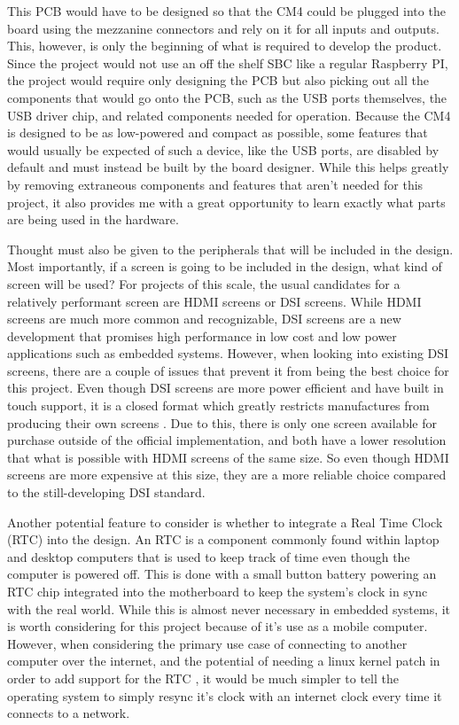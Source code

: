This PCB would have to be designed so that the CM4 could be plugged into the board using the mezzanine connectors and rely on it for all inputs and outputs.
This, however, is only the beginning of what is required to develop the product.
Since the project would not use an off the shelf SBC like a regular Raspberry PI, the project would require only designing the PCB but also picking out all the components that would go onto the PCB, such as the USB ports themselves, the USB driver chip, and related components needed for operation.
Because the CM4 is designed to be as low-powered and compact as possible, some features that would usually be expected of such a device, like the USB ports, are disabled by default and must instead be built by the board designer.
While this helps greatly by removing extraneous components and features that aren't needed for this project, it also provides me with a great opportunity to learn exactly what parts are being used in the hardware.

Thought must also be given to the peripherals that will be included in the design.
Most importantly, if a screen is going to be included in the design, what kind of screen will be used?
For projects of this scale, the usual candidates for a relatively performant screen are HDMI screens or DSI screens.
While HDMI screens are much more common and recognizable, DSI screens are a new development that promises high performance in low cost and low power applications such as embedded systems.
However, when looking into existing DSI screens, there are a couple of issues that prevent it from being the best choice for this project.
Even though DSI screens are more power efficient and have built in touch support, it is a closed format which greatly restricts manufactures from producing their own screens \cite{dsi_vs_hdmi}.
Due to this, there is only one screen available for purchase outside of the official implementation, and both have a lower resolution that what is possible with HDMI screens of the same size.
So even though HDMI screens are more expensive at this size, they are a more reliable choice compared to the still-developing DSI standard.

Another potential feature to consider is whether to integrate a Real Time Clock (RTC) into the design.
An RTC is a component commonly found within laptop and desktop computers that is used to keep track of time even though the computer is powered off.
This is done with a small button battery powering an RTC chip integrated into the motherboard to keep the system's clock in sync with the real world.
While this is almost never necessary in embedded systems, it is worth considering for this project because of it's use as a mobile computer.
However, when considering the primary use case of connecting to another computer over the internet, and the potential of needing a linux kernel patch in order to add support for the RTC \cite{rtc_kernelpatch}, it would be much simpler to tell the operating system to simply resync it's clock with an internet clock every time it connects to a network.

